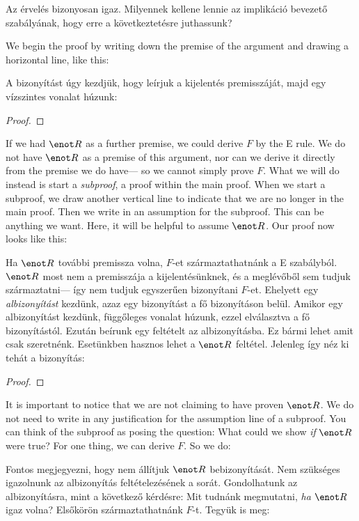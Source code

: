 Az érvelés bizonyosan igaz. Milyennek kellene lennie az implikáció bevezető szabályának, hogy erre a következtetésre juthassunk?



We begin the proof by writing down the premise of the argument and drawing a horizontal line, like this:

A bizonyítást úgy kezdjük, hogy leírjuk a kijelentés premisszáját, majd egy vízszintes vonalat húzunk:

\begin{proof}
\end{proof}

If we had $\enot R$ as a further premise, we could derive $F$ by the {\eor}E rule. We do not have $\enot R$ as a premise of this argument, nor can we derive it directly from the premise we do have--- so we cannot simply prove $F$. What we will do instead is start a \emph{subproof}, a proof within the main proof. When we start a subproof, we draw another vertical line to indicate that we are no longer in the main proof. Then we write in an assumption for the subproof. This can be anything we want. Here, it will be helpful to assume $\enot R$. Our proof now looks like this:

Ha $\enot R$ további premissza volna, $F$-et származtathatnánk a {\eor}E szabályból. $\enot R$ most nem a premisszája a kijelentésünknek, és a meglévőből sem tudjuk származtatni--- így nem tudjuk egyszerűen bizonyítani $F$-et. Ehelyett egy \emph{albizonyítást} kezdünk, azaz egy bizonyítást a fő bizonyításon belül. Amikor egy albizonyítást kezdünk, függőleges vonalat húzunk, ezzel elválasztva a fő bizonyítástól. Ezután beírunk egy feltételt az albizonyításba. Ez bármi lehet amit csak szeretnénk. Esetünkben hasznos lehet a $\enot R$ feltétel. Jelenleg így néz ki tehát a bizonyítás:

\begin{proof}
	\open
	\close
\end{proof}

It is important to notice that we are not claiming to have proven $\enot R$. We do not need to write in any justification for the assumption line of a subproof. You can think of the subproof as posing the question: What could we show \emph{if} $\enot R$ were true? For one thing, we can derive $F$. So we do:

Fontos megjegyezni, hogy nem állítjuk $\enot R$ bebizonyítását. Nem szükséges igazolnunk az albizonyítás feltételezésének a sorát. Gondolhatunk az albizonyításra, mint a következő kérdésre: Mit tudnánk megmutatni, \emph{ha} $\enot R$ igaz volna? Elsőkörön származtathatnánk $F$-t. Tegyük is meg:

